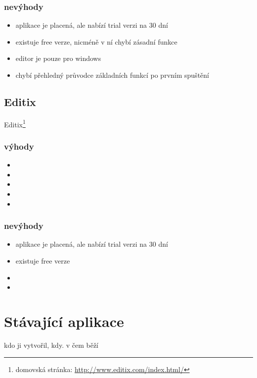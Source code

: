             \subsubsection{nevýhody}
                \begin{itemize}
                    \item aplikace je placená, ale nabízí trial verzi na 30 dní
                    \item existuje free verze, nicméně v ní chybí zásadní funkce
                    \item editor je pouze pro windows
                    \item chybí přehledný průvodce základních funkcí po prvním spuštění
                \end{itemize}
                
        \subsection{Editix} 
            Editix\footnote{domovská stránka: \url{http://www.editix.com/index.html/}} 
            \subsubsection{výhody}
                \begin{itemize}
                    \item 
                    \item 
                    \item 
                    \item 
                    \item 
                \end{itemize}
                
            \subsubsection{nevýhody}
                \begin{itemize}
                    \item aplikace je placená, ale nabízí trial verzi na 30 dní
                    \item existuje free verze
                    \item 
                    \item 
                \end{itemize}
    \section{Stávající aplikace}
        kdo ji vytvořil, kdy. v čem běží
        
